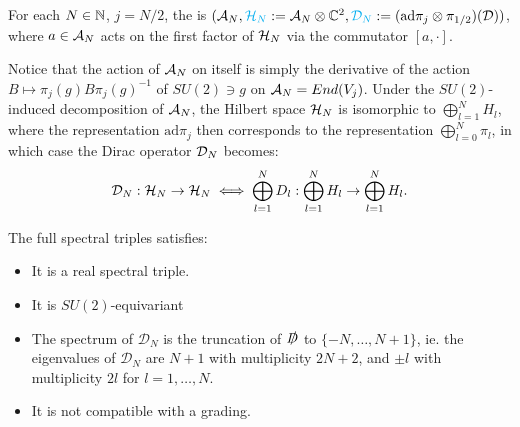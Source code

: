     



\linea

\begin{definition}
For each $N \in \mathbb{N}$, $j = N/2$, the  is $(\mathcal A_N, \textcolor{cyan}{\mathcal H_N} := \mathcal A_N \otimes \mathbb{C}^2, \textcolor{cyan}{\mathcal D_N} := (\text{ad}\pi_j \otimes \pi_{1/2})(\mathcal D) )$, where $a \in \mathcal A_N$ acts on the first factor of $\mathcal H_N$ via the commutator $[a, \cdot]$.
\end{definition}

Notice that the action of $\mathcal A_N$ on itself is simply the derivative of the action $B \mapsto \pi_j(g) B \pi_j(g)^{-1}$ of $SU(2) \ni g$ on $\mathcal A_N = End(V_j)$. Under the $SU(2)$-induced decomposition of $\mathcal A_N$, the Hilbert space $\mathcal H_N$ is isomorphic to $\bigoplus_{l =1}^N H_l$, where the representation $\text{ad}\pi_j$ then corresponds to the representation $\bigoplus_{l = 0}^N \pi_l$, in which case the Dirac operator $\mathcal D_N$ becomes:
\begin{equation}
    \mathcal D_N : \mathcal H_N \to \mathcal H_N  \iff \bigoplus_{l =1}^N D_l: \bigoplus_{l =1}^N H_l \to \bigoplus_{l =1}^N H_l.
\end{equation}

\begin{theorem}
The full spectral triples satisfies:
    \begin{itemize}
    
    \item It is a real spectral triple.
    
    \item It is $SU(2)$-equivariant
    
    \item The spectrum of $\mathcal D_N$ is the truncation of $\slashed D$ to $\{-N, \dots, N+1\}$, ie. the eigenvalues of $\mathcal D_N$ are $N+1$ with multiplicity $2N+2$, and $\pm l$ with multiplicity $2l$ for $l = 1, \dots, N$.
    
    \item It is not compatible with a grading.
    
    \end{itemize}
\end{theorem}

